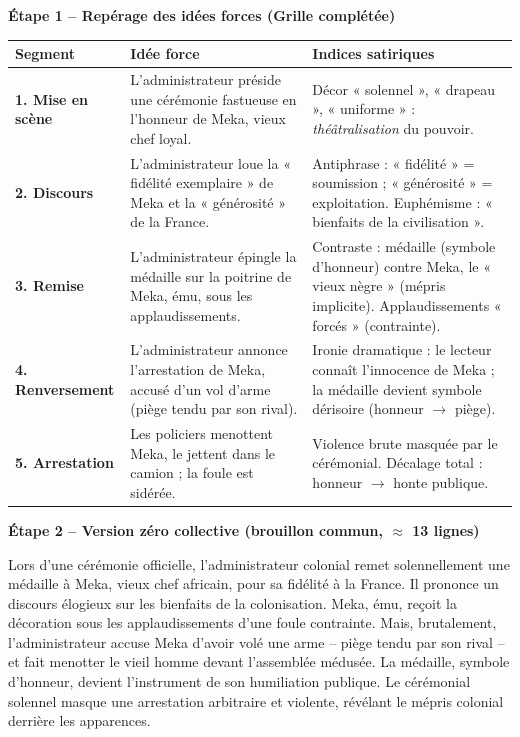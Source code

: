\documentclass[11pt]{article}
\newcommand{\cle}[1]{{\popxbold\color{popdark}#1}}
\newcounter{popsec}
\newcounter{popsub}
\newcommand{\courssub}[1]{%
  \stepcounter{popsub}%
  \par\vspace{9pt}\noindent{\popxbold\fontsize{11.5}{13}\selectfont\color{popink}{\color{poporange}\thepopsec.\thepopsub}\hspace{6pt}#1}\par\nopagebreak\vspace{4pt}
}
\begin{document}
\courssub{Démarche et corrigé commenté}
\begin{exoresolu}
\textbf{Étape 1 -- Repérage des idées forces (Grille complétée)}

\begin{center}
\begin{tabularx}{\linewidth}{|>{\bfseries}l|X|X|}\hline
\textbf{Segment} & \textbf{Idée force} & \textbf{Indices satiriques} \\ \hline
1. Mise en scène & L'administrateur préside une cérémonie fastueuse en l'honneur de Meka, vieux chef loyal. & Décor « solennel », « drapeau », « uniforme » : \emph{théâtralisation} du pouvoir. \\ \hline
2. Discours & L'administrateur loue la « fidélité exemplaire » de Meka et la « générosité » de la France. & \cle{Antiphrase} : « fidélité » = soumission ; « générosité » = exploitation. \cle{Euphémisme} : « bienfaits de la civilisation ». \\ \hline
3. Remise & L'administrateur épingle la médaille sur la poitrine de Meka, ému, sous les applaudissements. & \cle{Contraste} : médaille (symbole d'honneur) contre Meka, le « vieux nègre » (mépris implicite). Applaudissements « forcés » (contrainte). \\ \hline
4. Renversement & L'administrateur annonce l'arrestation de Meka, accusé d'un vol d'arme (piège tendu par son rival). & \cle{Ironie dramatique} : le lecteur connaît l'innocence de Meka ; la médaille devient \cle{symbole dérisoire} (honneur $\rightarrow$ piège). \\ \hline
5. Arrestation & Les policiers menottent Meka, le jettent dans le camion ; la foule est sidérée. & \cle{Violence brute} masquée par le cérémonial. \cle{Décalage} total : honneur $\rightarrow$ honte publique. \\ \hline
\end{tabularx}
\end{center}

\textbf{Étape 2 -- Version zéro collective (brouillon commun, $\approx$ 13 lignes)}

Lors d'une cérémonie officielle, l'administrateur colonial remet solennellement une médaille à Meka, vieux chef africain, pour sa fidélité à la France. Il prononce un discours élogieux sur les bienfaits de la colonisation. Meka, ému, reçoit la décoration sous les applaudissements d'une foule contrainte. Mais, brutalement, l'administrateur accuse Meka d'avoir volé une arme -- piège tendu par son rival -- et fait menotter le vieil homme devant l'assemblée médusée. La médaille, symbole d'honneur, devient l'instrument de son humiliation publique. Le cérémonial solennel masque une arrestation arbitraire et violente, révélant le mépris colonial derrière les apparences.


\end{exoresolu}
\end{document}
